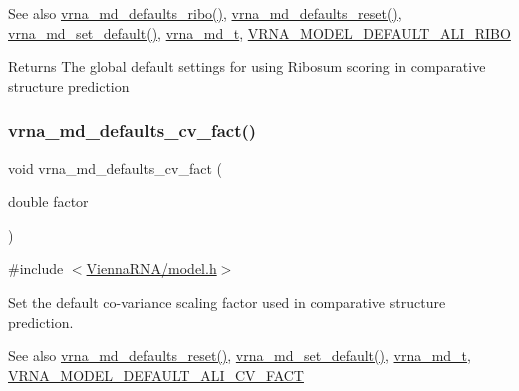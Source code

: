 \begin{DoxySeeAlso}{See also}
\hyperlink{group__model__details_ga937c45e1d06fd6168730a9b08d130be3}{vrna\+\_\+md\+\_\+defaults\+\_\+ribo()}, \hyperlink{group__model__details_ga70834424cf804d149937de89f80ceb45}{vrna\+\_\+md\+\_\+defaults\+\_\+reset()}, \hyperlink{group__model__details_ga8ac6ff84936282436f822644bf841f66}{vrna\+\_\+md\+\_\+set\+\_\+default()}, \hyperlink{group__model__details_ga1f8a10e12a0a1915f2a4eff0b28ea17c}{vrna\+\_\+md\+\_\+t}, \hyperlink{group__model__details_ga64b3ab65a9ca42d4ad1d05e193083147}{V\+R\+N\+A\+\_\+\+M\+O\+D\+E\+L\+\_\+\+D\+E\+F\+A\+U\+L\+T\+\_\+\+A\+L\+I\+\_\+\+R\+I\+BO} 
\end{DoxySeeAlso}
\begin{DoxyReturn}{Returns}
The global default settings for using Ribosum scoring in comparative structure prediction 
\end{DoxyReturn}
\mbox{\label{group__model__details_gad3a3f40baafd91a6ce80a91a68e20053}} 
\subsubsection{\texorpdfstring{vrna\+\_\+md\+\_\+defaults\+\_\+cv\+\_\+fact()}{vrna\_md\_defaults\_cv\_fact()}}
{\footnotesize\ttfamily void vrna\+\_\+md\+\_\+defaults\+\_\+cv\+\_\+fact (\begin{DoxyParamCaption}\item[{double}]{factor }\end{DoxyParamCaption})}



{\ttfamily \#include $<$\hyperlink{model_8h}{Vienna\+R\+N\+A/model.\+h}$>$}



Set the default co-\/variance scaling factor used in comparative structure prediction. 

\begin{DoxySeeAlso}{See also}
\hyperlink{group__model__details_ga70834424cf804d149937de89f80ceb45}{vrna\+\_\+md\+\_\+defaults\+\_\+reset()}, \hyperlink{group__model__details_ga8ac6ff84936282436f822644bf841f66}{vrna\+\_\+md\+\_\+set\+\_\+default()}, \hyperlink{group__model__details_ga1f8a10e12a0a1915f2a4eff0b28ea17c}{vrna\+\_\+md\+\_\+t}, \hyperlink{group__model__details_gaaaf3d73d6abc18d3889676952bfedb96}{V\+R\+N\+A\+\_\+\+M\+O\+D\+E\+L\+\_\+\+D\+E\+F\+A\+U\+L\+T\+\_\+\+A\+L\+I\+\_\+\+C\+V\+\_\+\+F\+A\+CT} 
\end{DoxySeeAlso}

